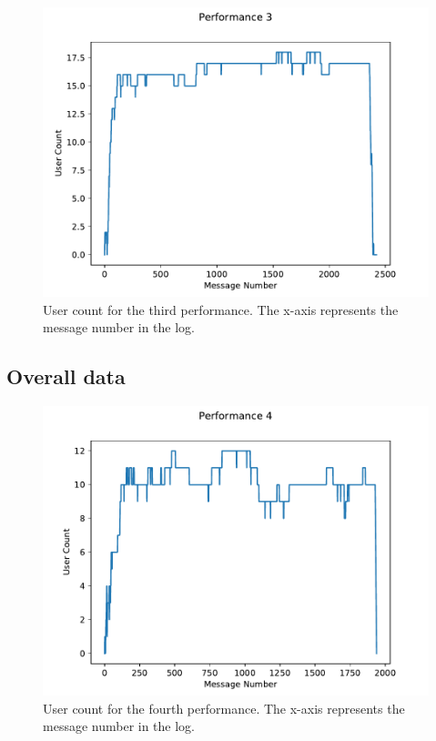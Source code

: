 \documentclass{aes2e}
\begin{document}
\begin{figure}
\centering
\includegraphics{num_analysis/p3_us.pdf}
\caption{User count for the third performance. The x-axis represents the message number in the log.}
\end{figure}

\subsection{Overall data}

\begin{figure}
\centering
\includegraphics{num_analysis/p4_us.pdf}
\caption{User count for the fourth performance. The x-axis represents the message number in the log.}
\end{figure}
\end{document}
